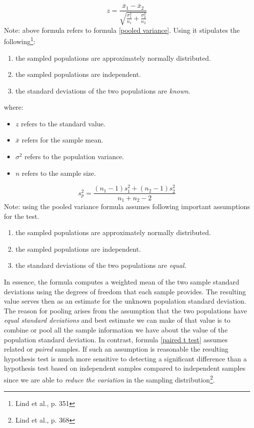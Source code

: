 \begin{equation}
\label{two-sample test of means sigma known}
z = \frac{\bar{x}_{1} - \bar{x}_{2}}{\sqrt{\frac{\sigma^{2}_{1}}{{n}_{1}}+\frac{{\sigma}^{2}_{2}}{n_{2}}}}
\end{equation}
Note: above formula refers to formula \eqref{pooled variance}. Using it stipulates the following\footnote{Lind et al., p. 351}:
\begin{enumerate}
 \item the sampled populations are approximately normally distributed.
 \item the sampled populations are independent.
 \item the standard deviations of the two populations are \textit{known}.
\end{enumerate}
where: 
\begin{itemize}
 \item $z$ refers to the standard value.
 \item $\bar{x}$ refers for the sample mean.
 \item $\sigma^{2}$ refers to the population variance.
 \item $n$ refers to the sample size. 
\end{itemize}
\hformbar


\begin{equation}
\label{pooled variance}
s^{2}_{p} = \frac{(n_{1} - 1)s^{2}_{1} + (n_{2}-1)s^{2}_{2}}{n_{1}+n_{2} -2}
\end{equation}
Note: using the pooled variance formula assumes following important assumptions for the test.
\begin{enumerate}
 \item the sampled populations are approximately normally distributed.
 \item the sampled populations are independent.
 \item the standard deviations of the two populations are \textit{equal}.
\end{enumerate}
In essence, the formula computes a weighted mean of the two sample standard deviations using the degrees of freedom that each sample provides. The resulting value serves then as an estimate for the unknown population standard deviation. The reason for pooling arises from the assumption that the two populations have \emph{equal standard deviations} and best estimate we can make of that value is to combine or pool all the sample information we have about the value of the population standard deviation. In contrast, formula \eqref{paired t test} assumes related or \emph{paired} samples. If such an assumption is reasonable the resulting hypothesis test is much more sensitive to detecting a significant difference than a hypothesis test based on independent samples compared to independent samples since we are able to \emph{reduce the variation} in the sampling distribution\footnote{Lind et al., p. 368}.

